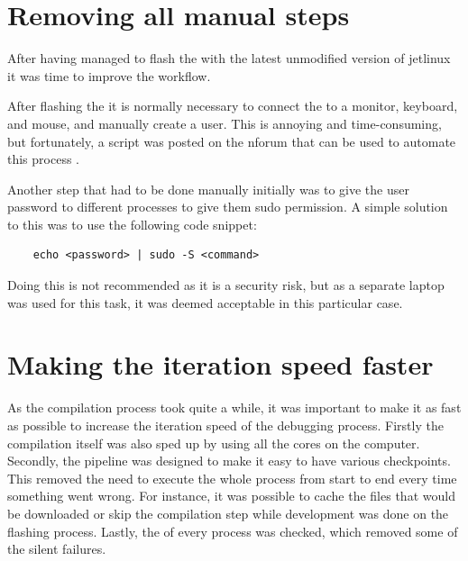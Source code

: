 \section{Removing all manual steps}
After having managed to flash the \jx with the latest unmodified version of \gls{jetlinux} it was time to improve the workflow.

After flashing the \jx it is normally necessary to connect the \jx to a monitor, keyboard, and mouse, and manually create a user.
This is annoying and time-consuming, but fortunately, a script was posted on the \gls{nforum} that can be used to automate this process \cite{waynewwwScriptBypassAccountJun2819}.

Another step that had to be done manually initially was to give the user password to different processes to give them sudo permission.
A simple solution to this was to use the following code snippet:
\begin{verbatim}
    echo <password> | sudo -S <command>
\end{verbatim}
Doing this is not recommended as it is a security risk, but as a separate laptop was used for this task, it was deemed acceptable in this particular case.

\section{Making the iteration speed faster}
As the compilation process took quite a while, it was important to make it as fast as possible to increase the iteration speed of the debugging process.
Firstly the compilation itself was also sped up by using all the cores on the computer.
Secondly, the pipeline was designed to make it easy to have various checkpoints.
This removed the need to execute the whole process from start to end every time something went wrong.
For instance, it was possible to cache the files that would be downloaded or skip the compilation step while development was done on the flashing process.
Lastly, the  of every process was checked, which removed some of the silent failures.

